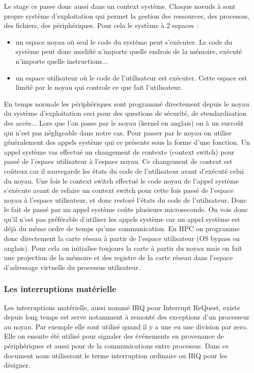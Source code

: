 Le stage ce passe donc aussi dans un context système.
Chaque noeuds à sont propre système d'exploitation qui permet la gestion des ressources, des processus, des fichiers, des périphériques.
Pour cela le système à 2 espaces :
\begin{itemize}
  \item un espace noyau où seul le code du système peut s'exécuter. Le code du système peut donc modifié n'importe quelle endrois de la mémoire, exécuté n'importe quelle instructions...
  \item un espace utilisateur où le code de l'utilisateur est exécuter. Cette espace est limité par le noyau qui controle ce que fait l'utilisateur.
\end{itemize}

En temps normale les périphériques sont programmé directement depuis le noyau du système d'exploitation ceci pour des questions de sécurité, de stendardisation des accès...
Lors que l'on passe par le noyau (kernel en anglais) on à un surcoût qui n'est pas négligeable dans notre cas.
Pour passer par le noyau on utilise généralement des appels système qui ce présente sous la forme d'une fonction.
Un appel système vas effectué un changement de contexte (context switch) pour passé de l'espace utilisateur à l'espace noyau.
Ce changement de context est coûteux car il sauvegarde les états du code de l'utilisateur avant d'exécuté celui du noyau.
Une fois le context switch effectué le code noyau de l'appel système s'exécute avant de refaire un context switch pour cette fois passé de l'espace noyau à l'espace utilisateur, et donc restoré l'états du code de l'utilisateur.
Donc le fait de passé par un appel système coûte plusieurs microseconde.
On vois donc qu'il n'est pas préférable d'utiliser les appels système car un appel système est déjà du même ordre de temps qu'une communication.
En HPC on programme donc directement la carte réseau à partir de l'espace utilisateur (OS bypass en anglais).
Pour cela on initialise toujours la carte à partir du noyau mais on fait une projection de la mémoire et des registre de la carte réseau dans l'espace d'adressage virtuelle du processus utilisateur.

\subsubsection{Les interruptions matérielle}

Les interruptions matérielle, aussi nommé IRQ pour Interrupt ReQuest, existe depuis long temps est serve notamment à remonté des exceptions d'un processeur au noyau.
Par exemple elle sont utilisé quand il y a une eu une division par zero.
Elle on ensuite été utilisé pour signaler des événements en provenance de périphériques et aussi pour de la communications entre processus.
Dans ce document nous utiliseront le terme interruption ordinaire ou IRQ pour les désigner.

